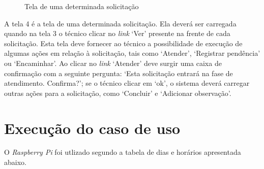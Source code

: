 \begin{figure}[ht]
    \centering
    \caption{Tela de uma determinada solicitação}
\end{figure}

A tela 4 é a tela de uma determinada solicitação. Ela deverá ser carregada quando na tela 3 o técnico clicar no \textit{link} ‘Ver’ presente na frente de cada solicitação. Esta tela deve fornecer ao técnico a possibilidade de execução de algumas ações em relação à solicitação, tais como ‘Atender’, ‘Registrar pendência’ ou ‘Encaminhar’. Ao clicar no \textit{link} ‘Atender’ deve surgir uma caixa de confirmação com a seguinte pergunta: ‘Esta solicitação entrará na fase de atendimento. Confirma?’; se o técnico clicar em ‘ok’, o sistema deverá carregar outras ações para a solicitação, como ‘Concluir’ e ‘Adicionar observação’.

\section{Execução do caso de uso}

O \textit{Raspberry Pi} foi utlizado segundo a tabela de dias e horários apresentada abaixo.

